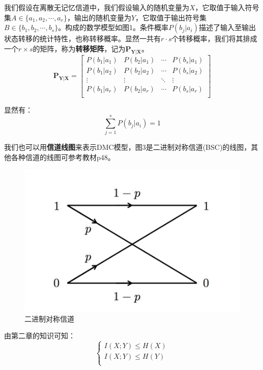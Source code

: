 \documentclass[UTF8,a4paper,11pt]{article}
\begin{document}
我们假设在离散无记忆信道中，我们假设输入的随机变量为$X$，它取值于输入符号集$A\in \{a_1,a_2,\cdots,a_r\}$，输出的随机变量为$Y$，它取值于输出符号集$B\in \{b_1,b_2,\cdots,b_s\}$。构成的数学模型如图1。条件概率$P(b_j|a_i)$描述了输入至输出状态转移的统计特性，也称转移概率。显然一共有$r\cdot s$个转移概率，我们将其排成一个$r\times s$的矩阵，称为\textbf{转移矩阵}，记为$\bm{P_{Y|X}}$。
\begin{equation}
\bm{P_{Y|X}}=
\begin{bmatrix}
P(b_1|a_1)&P(b_2|a_1)&\cdots&P(b_s|a_1)\\
P(b_1|a_2)&P(b_2|a_2)&\cdots&P(b_s|a_2)\\
\vdots&\vdots&\ddots&\vdots\\
P(b_1|a_r)&P(b_2|a_r)&\cdots&P(b_s|a_r)\\
\end{bmatrix}
\end{equation}

显然有：
\begin{equation}
\sum_{j=1}^sP(b_j|a_i)=1
\end{equation}

我们也可以用\textbf{信道线图}来表示DMC模型，图3是二进制对称信道(BSC)的线图，其他各种信道的线图可参考教材p48。
\begin{figure}[htbp]
\centering
\includegraphics[scale=0.45]{p3.png}
\caption{二进制对称信道}
\end{figure}

由第二章的知识可知：
\begin{equation}
\begin{cases}
I(X;Y)\le H(X) \\
I(X;Y)\le H(Y) \\
\end{cases}
\end{equation}
\end{document}
